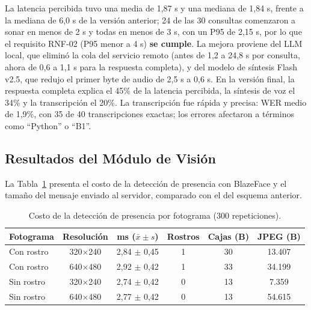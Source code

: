 La latencia percibida tuvo una media de 1,87 s y una mediana de 1,84 s, frente a la mediana de 6,0 s de la versión anterior; 24 de las 30 consultas comenzaron a sonar en menos de 2 s y todas en menos de 3 s, con un P95 de 2,15 s, por lo que el requisito RNF-02 (P95 menor a 4 s) \textbf{se cumple}. La mejora proviene del LLM local, que eliminó la cola del servicio remoto (antes de 1,2 a 24,8 s por consulta, ahora de 0,6 a 1,1 s para la respuesta completa), y del modelo de síntesis Flash v2.5, que redujo el primer byte de audio de 2,5 s a 0,6 s. En la versión final, la respuesta completa explica el 45\% de la latencia percibida, la síntesis de voz el 34\% y la transcripción el 20\%. La transcripción fue rápida y precisa: WER medio de 1,9\%, con 35 de 40 transcripciones exactas; los errores afectaron a términos como ``Python'' o ``B1''.

\subsection{Resultados del Módulo de Visión}
La Tabla~\ref{tab:vision} presenta el costo de la detección de presencia con BlazeFace y el tamaño del mensaje enviado al servidor, comparado con el del esquema anterior.

\begin{table}[H]
  \caption{Costo de la detección de presencia por fotograma (300 repeticiones).}
  \label{tab:vision}
  \centering
  \small
  \setlength{\tabcolsep}{3.5pt}
  \renewcommand{\arraystretch}{1.2}
  \begin{tabular}{|l|c|c|c|c|c|}
    \hline
    \rowcolor[HTML]{EFEFEF}
    \textbf{Fotograma} & \textbf{Resolución} & \textbf{ms ($\bar{x} \pm s$)} & \textbf{Rostros} & \textbf{Cajas (B)} & \textbf{JPEG (B)} \\ \hline
    Con rostro & 320$\times$240 & 2,84 $\pm$ 0,45 & 1 & 30 & 13.407 \\ \hline
    Con rostro & 640$\times$480 & 2,92 $\pm$ 0,42 & 1 & 33 & 34.199 \\ \hline
    Sin rostro & 320$\times$240 & 2,74 $\pm$ 0,42 & 0 & 13 & 7.359 \\ \hline
    Sin rostro & 640$\times$480 & 2,77 $\pm$ 0,42 & 0 & 13 & 54.615 \\ \hline
  \end{tabular}
  \elaboradopor{\autorTFG}
\end{table}

